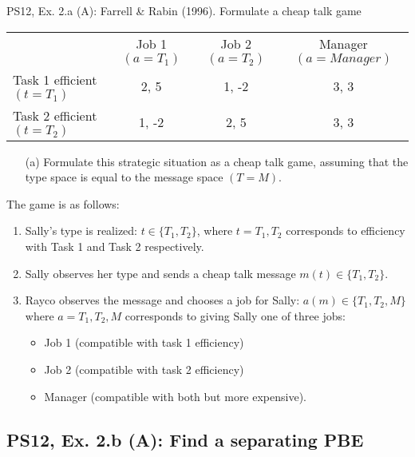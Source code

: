 \begin{frame}{PS12, Ex. 2.a (A): Farrell \& Rabin (1996). Formulate a cheap talk game}
  \begin{table}
    \begin{tabular}{l|c|c|c|}
        \multicolumn{1}{c}{} & \multicolumn{1}{c}{Job 1 $(a=T_1)$} & \multicolumn{1}{c}{Job 2 $(a=T_2)$} & \multicolumn{1}{c}{Manager $(a=Manager)$} \\\cline{2-4}
         Task 1 efficient $(t=T_1)$ & 2, 5 & 1, -2 & 3, 3 \\\cline{2-4}
         Task 2 efficient $(t=T_2)$ & 1, -2 & 2, 5 & 3, 3 \\\cline{2-4}
    \end{tabular}
  \end{table}\vspace{-12pt}
  \begin{itemize}
      \item[(a)] Formulate this strategic situation as a cheap talk game, assuming that the type space is equal to the message space $(T = M)$.
    \end{itemize}\vspace{-6pt}
    The game is as follows:\vspace{-6pt}
    \begin{enumerate}
      \item Sally's type is realized: $t\in\{T_1,T_2\}$, where $t=T_1,T_2$ corresponds to efficiency with Task 1 and Task 2 respectively.
      \item Sally observes her type and sends a cheap talk message $m(t)\in\{T_1,T_2\}$.
      \item Rayco observes the message and chooses a job for Sally: $a(m)\in\{T_1,T_2,M\}$ where $a=T_1,T_2,M$ corresponds to giving Sally one of three jobs:
      \begin{itemize}\normalsize
        \item Job 1 (compatible with task 1 efficiency)
        \item Job 2 (compatible with task 2 efficiency)
        \item Manager (compatible with both but more expensive).
      \end{itemize}
    \end{enumerate}
    \vfill\null
\end{frame}



\subsection{PS12, Ex. 2.b (A): Find a separating PBE}

